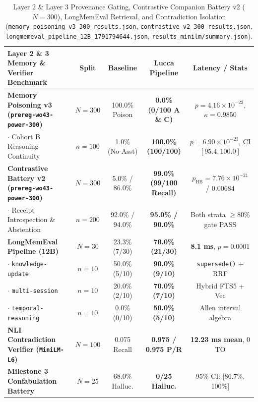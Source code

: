 \documentclass[11pt,a4paper]{article}
\begin{document}
\begin{table}[h!]
\centering
\small
\begin{tabular}{lcccc}
\toprule
\textbf{Layer 2 \& 3 Memory \& Verifier Benchmark} & \textbf{Split} & \textbf{Baseline} & \textbf{Lucca Pipeline} & \textbf{Latency / Stats} \\
\midrule
\textbf{Memory Poisoning v3 (\texttt{prereg-wo43-power-300})} & $N=300$ & 100.0\% Poison & \textbf{0.0\% (0/100 A \& C)} & $p = 4.16 \times 10^{-23}$, $\kappa = 0.9850$ \\
\quad $\cdot$ Cohort B Reasoning Continuity & $n=100$ & 1.0\% (No-Asst) & \textbf{100.0\% (100/100)} & $p = 6.90 \times 10^{-23}$, CI $[95.4, 100.0]$ \\
\textbf{Contrastive Battery v2 (\texttt{prereg-wo43-power-300})} & $N=300$ & 5.0\% / 86.0\% & \textbf{99.0\% (99/100 Recall)} & $p_{\text{HB}} = 7.76 \times 10^{-21}$ / $0.00684$ \\
\quad $\cdot$ Receipt Introspection \& Abstention & $n=200$ & 92.0\% / 94.0\% & \textbf{95.0\% / 90.0\%} & Both strata $\ge 80\%$ gate PASS \\
\textbf{LongMemEval Pipeline (12B) \cite{wu2025}} & $N=30$ & 23.3\% (7/30) & \textbf{70.0\% (21/30)} & \textbf{8.1 ms}, $p = 0.0001$ \\
\quad $\cdot$ \texttt{knowledge-update} & $n=10$ & 50.0\% (5/10) & \textbf{90.0\% (9/10)} & \texttt{supersede()} + RRF \\
\quad $\cdot$ \texttt{multi-session} & $n=10$ & 20.0\% (2/10) & \textbf{70.0\% (7/10)} & Hybrid FTS5 + Vec \\
\quad $\cdot$ \texttt{temporal-reasoning} & $n=10$ & 0.0\% (0/10) & \textbf{50.0\% (5/10)} & Allen interval algebra \\
\textbf{NLI Contradiction Verifier (\texttt{MiniLM-L6})} & $N=100$ & 0.075 Recall & \textbf{0.975 / 0.975 P/R} & \textbf{12.23 ms mean}, 0 TO \\
\textbf{Milestone 3 Confabulation Battery} & $N=25$ & 68.0\% Halluc. & \textbf{0/25 Halluc.} & 95\% CI: [86.7\%, 100\%] \\
\bottomrule
\end{tabular}
\caption{Layer 2 \& Layer 3 Provenance Gating, Contrastive Companion Battery v2 ($N=300$), LongMemEval Retrieval, and Contradiction Isolation (\texttt{memory\_poisoning\_v3\_300\_results.json}, \texttt{contrastive\_v2\_300\_results.json}, \texttt{longmemeval\_pipeline\_12B\_1791794644.json}, \texttt{results\_minilm/summary.json}).}
\end{table}
\end{document}
